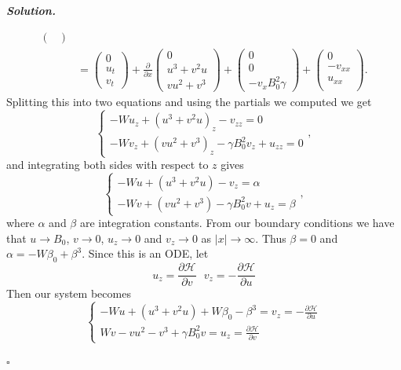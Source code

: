 \documentclass[12pt]{report}
\newenvironment{solution}[1][\it{Solution}]{\textbf{#1. } }{$\square$}
\newcommand{\pp}[2]{\frac{\partial #1}{\partial #2}} %
\begin{document}
\begin{solution}
\begin{enumerate}
\begin{align*}
\begin{pmatrix}
            \end{pmatrix}\\
            &= \begin{pmatrix}
                0\\u_t\\v_t
            \end{pmatrix} + \pp{}{x}\begin{pmatrix}
                0\\u^3 + v^2 u\\vu^2+v^3
            \end{pmatrix} + \begin{pmatrix}
                0\\0\\-v_xB_0^2\gamma
            \end{pmatrix} + \begin{pmatrix}
                0\\-v_{xx}\\u_{xx}\\
            \end{pmatrix}.
        \end{align*}
        Splitting this into two equations and using the partials we computed we get
        \[ 
            \begin{cases}
                -Wu_z + (u^3 + v^2u)_z - v_{zz} = 0\\
                -Wv_z + (vu^2 + v^3)_z - \gamma B_0^2v_z + u_{zz} = 0
            \end{cases},
        \]
        and integrating both sides with respect to $z$ gives
        \[ 
            \begin{cases}
                -Wu + (u^3 + v^2u) - v_{z} = \alpha\\
                -Wv + (vu^2 + v^3) - \gamma B_0^2v + u_{z} = \beta
            \end{cases},
        \]
        where $\alpha$ and $\beta$ are integration constants. From our boundary conditions we have that $u \to B_0$, $v \to 0$, $u_z \to 0$ and $v_z \to 0$ as $|x| \to \infty$. Thus $\beta = 0$ and $\alpha = -W \beta_0 + \beta^3$. Since this is an ODE, let
        \[ 
            u_{z} = \pp{\mathcal{H}}{v} ~~~ v_{z} = -\pp{\mathcal{H}}{u}
        \]
        Then our system becomes
        \[ 
            \begin{cases}
                -Wu + (u^3 + v^2u) + W \beta_0 - \beta^3 = v_{z} = -\pp{\mathcal{H}}{u}\\
                Wv - vu^2 - v^3 + \gamma B_0^2v = u_{z} = \pp{\mathcal{H}}{v}

\end{cases}\]
\end{enumerate}
\end{solution}
\end{document}
